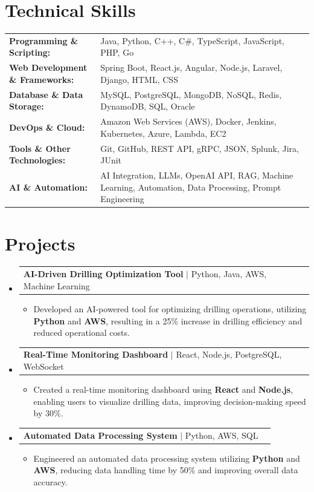 \documentclass[letterpaper,10pt]{article}
\makeatletter
\newcommand{\resumeItem}[1]{
  \item{\fontsize{8pt}{9pt}\selectfont
    #1 \vspace{-3pt}
  }
}
\newcommand{\resumeProjectHeading}[2]{
    \item
    \begin{tabular*}{1.001\textwidth}{l@{\extracolsep{\fill}}r}
      \fontsize{8.5pt}{10pt}#1 & \textbf{\fontsize{8.5pt}{10pt} #2}\\
    \end{tabular*}\vspace{-7pt}
}
\newcommand{\resumeSubHeadingListStart}{\begin{itemize}[leftmargin=0pt, label={}]}
\newcommand{\resumeSubHeadingListEnd}{\end{itemize}}
\newcommand{\resumeItemListStart}{\begin{itemize}[leftmargin=*]}
\newcommand{\resumeItemListEnd}{\end{itemize}\vspace{-5pt}}
\makeatother
\begin{document}
\section{Technical Skills}
        \vspace{-14pt}
        \begin{table}[h]
            \fontsize{8pt}{9pt}\selectfont
            \begin{tabular}{p{0.3\linewidth} p{0.7\linewidth}}
                \textbf{Programming \& Scripting:} & Java, Python, C++, C\#, TypeScript, JavaScript, PHP, Go \\
                \textbf{Web Development \& Frameworks:} & Spring Boot, React.js, Angular, Node.js, Laravel, Django, HTML, CSS \\
                \textbf{Database \& Data Storage:} & MySQL, PostgreSQL, MongoDB, NoSQL, Redis, DynamoDB, SQL, Oracle \\
                \textbf{DevOps \& Cloud:} & Amazon Web Services (AWS), Docker, Jenkins, Kubernetes, Azure, Lambda, EC2 \\
                \textbf{Tools \& Other Technologies:} & Git, GitHub, REST API, gRPC, JSON, Splunk, Jira, JUnit \\
                \textbf{AI \& Automation:} & AI Integration, LLMs, OpenAI API, RAG, Machine Learning, Automation, Data Processing, Prompt Engineering \\
            \end{tabular}
        \end{table}
 \vspace{-18pt}

\section{Projects}
    \vspace{-5pt}
    \resumeSubHeadingListStart
          \resumeProjectHeading
            {\textbf{AI-Driven Drilling Optimization Tool} $|$ Python, Java, AWS, Machine Learning}{}
            \resumeItemListStart
                \resumeItem{Developed an AI-powered tool for optimizing drilling operations, utilizing \textbf{Python} and \textbf{AWS}, resulting in a 25\% increase in drilling efficiency and reduced operational costs.}
            \resumeItemListEnd
        \vspace{-12pt}
    
        \resumeProjectHeading
            {\textbf{Real-Time Monitoring Dashboard} $|$ React, Node.js, PostgreSQL, WebSocket}{}
        \resumeItemListStart
                \resumeItem{Created a real-time monitoring dashboard using \textbf{React} and \textbf{Node.js}, enabling users to visualize drilling data, improving decision-making speed by 30\%.}
        \resumeItemListEnd
      \vspace{-12pt}
      \resumeProjectHeading
        {\textbf{Automated Data Processing System} $|$ Python, AWS, SQL}{}
    \resumeItemListStart
            \resumeItem{Engineered an automated data processing system utilizing \textbf{Python} and \textbf{AWS}, reducing data handling time by 50\% and improving overall data accuracy.}
    \resumeItemListEnd
    \resumeSubHeadingListEnd
\end{document}
